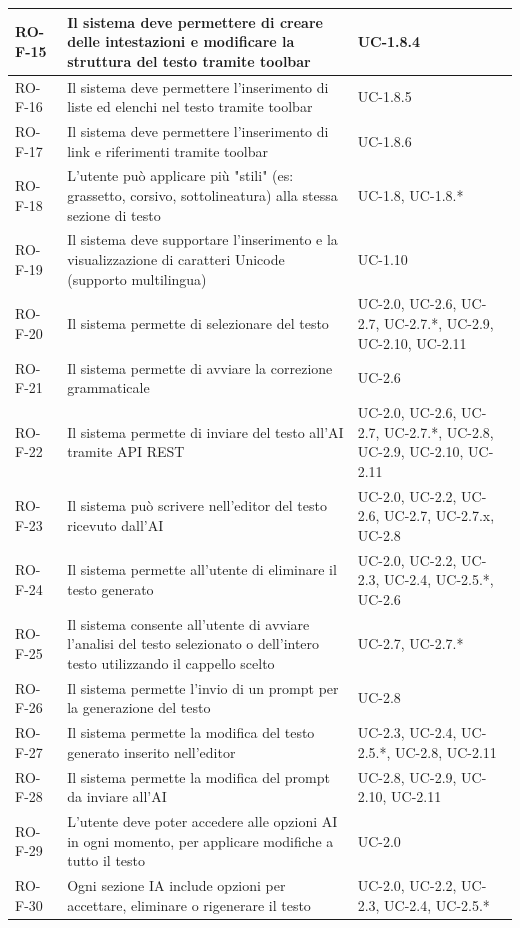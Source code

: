 \documentclass[11pt,a4paper]{article}
\begin{document}
\begin{longtable}{|p{}|>{\raggedright\arraybackslash}p{}|p{}|}
\hline
RO-F-15 & Il sistema deve permettere di creare delle intestazioni e modificare la struttura del testo tramite toolbar & UC-1.8.4 \\
\hline
RO-F-16 & Il sistema deve permettere l'inserimento di liste ed elenchi nel testo tramite toolbar & UC-1.8.5 \\
\hline
RO-F-17 & Il sistema deve permettere l'inserimento di link e riferimenti tramite toolbar & UC-1.8.6 \\
\hline
RO-F-18 & L'utente può applicare più "stili" (es: grassetto, corsivo, sottolineatura) alla stessa sezione di testo & UC-1.8, UC-1.8.* \\
\hline
RO-F-19 & Il sistema deve supportare l'inserimento e la visualizzazione di caratteri Unicode (supporto multilingua) & UC-1.10 \\
\hline
RO-F-20 & Il sistema permette di selezionare del testo & UC-2.0, UC-2.6, UC-2.7, UC-2.7.*, UC-2.9, UC-2.10, UC-2.11 \\
\hline
RO-F-21 & Il sistema permette di avviare la correzione grammaticale & UC-2.6 \\
\hline
RO-F-22 & Il sistema permette di inviare del testo all'AI tramite API REST & UC-2.0, UC-2.6, UC-2.7, UC-2.7.*, UC-2.8, UC-2.9, UC-2.10, UC-2.11 \\
\hline
RO-F-23 & Il sistema può scrivere nell'editor del testo ricevuto dall'AI & UC-2.0, UC-2.2, UC-2.6, UC-2.7, UC-2.7.x, UC-2.8 \\
\hline
RO-F-24 & Il sistema permette all'utente di eliminare il testo generato & UC-2.0, UC-2.2, UC-2.3, UC-2.4, UC-2.5.*, UC-2.6 \\
\hline
RO-F-25 & Il sistema consente all'utente di avviare l'analisi del testo selezionato o dell'intero testo utilizzando il cappello scelto & UC-2.7, UC-2.7.* \\
\hline
RO-F-26 & Il sistema permette l'invio di un prompt per la generazione del testo & UC-2.8 \\
\hline
RO-F-27 & Il sistema permette la modifica del testo generato inserito nell'editor & UC-2.3, UC-2.4, UC-2.5.*, UC-2.8, UC-2.11 \\
\hline
RO-F-28 & Il sistema permette la modifica del prompt da inviare all'AI & UC-2.8, UC-2.9, UC-2.10, UC-2.11 \\
\hline
RO-F-29 & L'utente deve poter accedere alle opzioni AI in ogni momento, per applicare modifiche a tutto il testo & UC-2.0 \\
\hline
RO-F-30 & Ogni sezione IA include opzioni per accettare, eliminare o rigenerare il testo & UC-2.0, UC-2.2, UC-2.3, UC-2.4, UC-2.5.* \\

\end{longtable}
\end{document}
